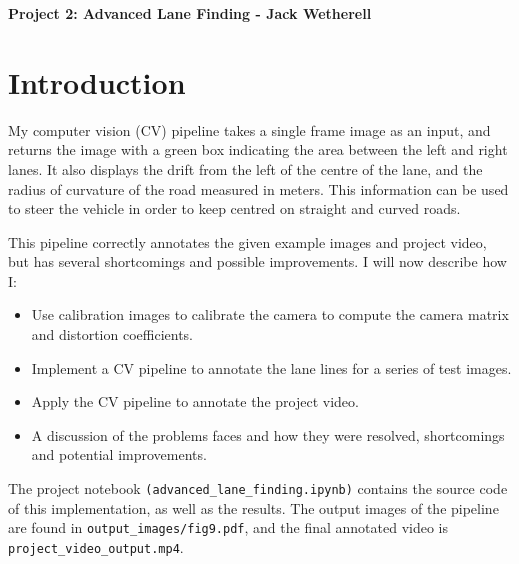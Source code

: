 \documentclass[letterpaper,12pt]{article}
\begin{document}
\title{}
\author{}
\date{}


\begin{center}
\textbf{Project 2: Advanced Lane Finding - Jack Wetherell} \\
\end{center}


\section{Introduction}
My computer vision (CV) pipeline takes a single frame image as an input, and returns the image with a green box indicating the area between the left and right lanes. It also displays the drift from the left of the centre of the lane, and the radius of curvature of the road measured in meters. This information can be used to steer the vehicle in order to keep centred on straight and curved roads.

This pipeline correctly annotates the given example images and project video, but has several shortcomings and possible improvements. I will now describe how I:
\begin{itemize}
\item Use calibration images to calibrate the camera to compute the camera matrix and distortion coefficients.
\item Implement a CV pipeline to annotate the lane lines for a series of test images.
\item Apply the CV pipeline to annotate the project video.
\item A discussion of the problems faces and how they were resolved, shortcomings and potential improvements. 
\end{itemize}
The project notebook \texttt{(advanced\_lane\_finding.ipynb)} contains the source code of this implementation, as well as the results. The output images of the pipeline are found in \texttt{output\_images/fig9.pdf}, and the final annotated video is \texttt{project\_video\_output.mp4}.
\end{document}
